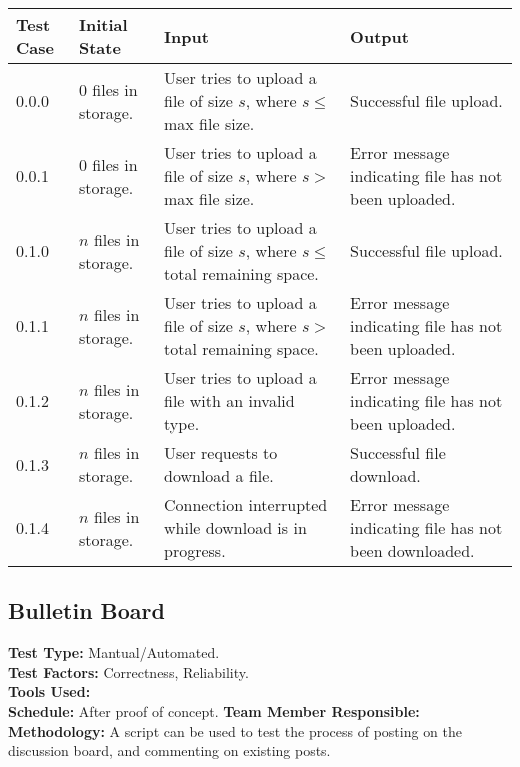 \documentclass[12pt]{article}
\begin{document}
\begin{longtable}{|p{2cm}|p{3cm}|p{5cm}|p{5cm}|}
\hline
\textbf{Test Case} & \textbf{Initial State} & \textbf{Input} & \textbf{Output} \\ \hline
0.0.0 & 0 files in storage. & User tries to upload a file of size $s$, where $s \le$ max file size. & Successful file upload.\\
\hline
0.0.1 & 0 files in storage. & User tries to upload a file of size $s$, where $s >$ max file size. & Error message indicating file has not been uploaded.\\
\hline
0.1.0 & $n$ files in storage. & User tries to upload a file of size $s$, where $s \le$ total remaining space. & Successful file upload.\\
\hline
0.1.1 & $n$ files in storage. & User tries to upload a file of size $s$, where $s >$ total remaining space. & Error message indicating file has not been uploaded.\\
\hline
0.1.2 & $n$ files in storage. & User tries to upload a file with an invalid type. & Error message indicating file has not been uploaded.\\
\hline
0.1.3 & $n$ files in storage. & User requests to download a file. & Successful file download.\\
\hline
0.1.4 & $n$ files in storage. & Connection interrupted while download is in progress. & Error message indicating file has not been downloaded.\\
\hline
\end{longtable}

\subsection{Bulletin Board}
\textbf{Test Type:} Mantual/Automated. \\
\textbf{Test Factors:} Correctness, Reliability. \\
\textbf{Tools Used:} \\
\textbf{Schedule:} After proof of concept.
\textbf{Team Member Responsible:} \\
\textbf{Methodology:} A script can be used to test the process of posting on the discussion board, and commenting on existing posts.
\end{document}
